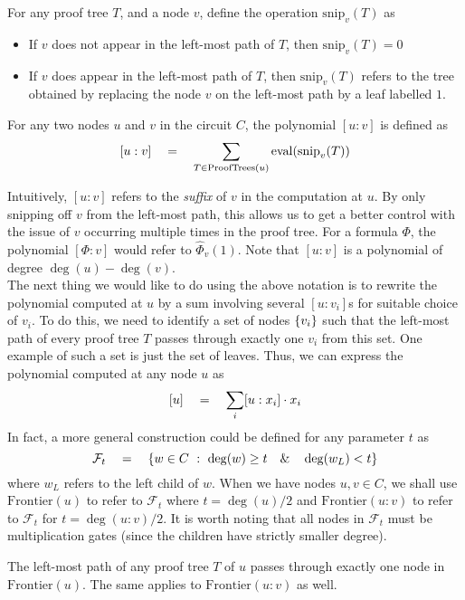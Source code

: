\begin{definition}
For any proof tree $T$, and a node $v$, define the operation $\mathrm{snip}_v(T)$ as
\begin{itemize}
  \item If $v$ does not appear in the left-most path of $T$, then $\mathrm{snip}_v(T) = 0$
  \item If $v$ does appear in the left-most path of $T$, then $\mathrm{snip}_v(T)$ refers to the tree obtained by replacing the node $v$ on the left-most path by a leaf labelled $1$. 
\end{itemize}
For any two nodes $u$ and $v$ in the circuit $C$, the polynomial $[u:v]$ is defined as
\[
[u:v] \quad = \quad \sum_{T \in \mathrm{ProofTrees}(u)} \mathrm{eval}(\mathrm{snip}_v(T))
\]
\end{definition}

Intuitively, $[u:v]$ refers to the \emph{suffix} of $v$ in the computation at $u$. By only snipping off $v$ from the left-most path, this allows us to get a better control with the issue of $v$ occurring multiple times in the proof tree. For a formula $\Phi$, the polynomial $[\Phi:v]$ would refer to $\hat{\Phi}_v(1)$. Note that $[u:v]$ is a polynomial of degree $\deg(u) - \deg(v)$. \\

The next thing we would like to do using the above notation is to rewrite the polynomial computed at $u$ by a sum involving several $[u:v_i]$s for suitable choice of $v_i$. To do this, we need to identify a set of nodes $\left\{v_i\right\}$ such that the left-most path of every proof tree $T$ passes through exactly one $v_i$ from this set. One example of such a set is just the set of leaves. Thus, we can express the polynomial computed at any node $u$ as
\[
[u] \quad = \quad \sum_{i} [u:x_i] \cdot x_i
\]
In fact, a more general construction could be defined for any parameter $t$ as
\[
\mathcal{F}_t  \quad = \quad \left\{{w\in C}\ : \ {\deg(w) \geq t \quad \& \quad \deg(w_L) < t}\right\}
\]
where $w_L$ refers to the left child of $w$. When we have nodes $u,v \in C$, we shall use $\mathrm{Frontier}(u)$ to refer to $\mathcal{F}_t$ where $t = \deg(u)/2$ and $\mathrm{Frontier}(u:v)$ to refer to $\mathcal{F}_t$ for $t = \deg(u:v)/2$. It is worth noting that all nodes in $\mathcal{F}_t$ must be multiplication gates (since the children have strictly smaller degree). 


\begin{observation}
The left-most path of any proof tree $T$ of $u$ passes through exactly one node in $\mathrm{Frontier}(u)$. The same applies to $\mathrm{Frontier}(u:v)$ as well. 
\end{observation}

